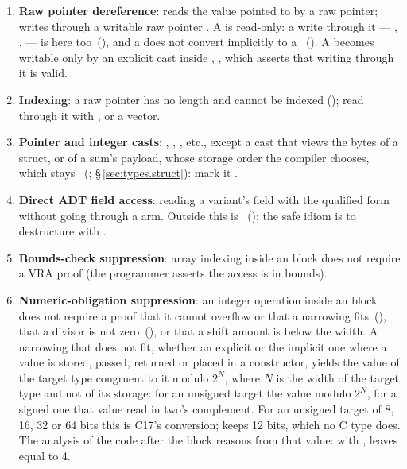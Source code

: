 \begin{enumerate}
  \item \textbf{Raw pointer dereference}:  reads the value
        pointed to by a raw pointer;  writes through a
        writable raw pointer . A  is read-only: a write through it
        --- , ,  --- is \illformed{} here
        too~(), and a  does not convert implicitly to a
        ~(). A  becomes writable only by an explicit
        cast inside , , which asserts that writing through it
        is valid.
  \item \textbf{Indexing}: a raw pointer has no length and cannot be indexed
        (); read through it with , or  a vector.
  \item \textbf{Pointer and integer casts}: ,
        , , etc., except a cast that views the bytes of a struct,
        or of a sum's payload, whose storage order the compiler chooses, which stays
        \illformed{}~(; \S\,\ref{sec:types.struct}): mark it \tok{[ordered]}.
  \item \textbf{Direct ADT field access}: reading a variant's field with the
        qualified form  without going through a
         arm.  Outside  this is
        \illformed{}~(); the safe idiom is to destructure with
        .
  \item \textbf{Bounds-check suppression}: array indexing inside an
         block does not require a VRA proof (the
        programmer asserts the access is in bounds).
  \item \textbf{Numeric-obligation suppression}: an integer operation inside an
         block does not require a proof that it cannot overflow or that a
        narrowing fits~(), that a divisor is not zero~(), or that a
        shift amount is below the width. A narrowing that does not fit, whether an explicit
         or the implicit one where a value is stored, passed, returned or placed in a
        constructor, yields the value of the target type congruent to it modulo $2^N$, where
        $N$ is the width of the target type and not of its storage: for an unsigned target the
        value modulo $2^N$, for a signed one that value read in two's complement.  For an
        unsigned target of 8, 16, 32 or 64 bits this is C17's conversion;  keeps
        12 bits, which no C type does.  The analysis of the code after the block reasons from
        that value: with ,  leaves
         equal to 4.
\end{enumerate}

